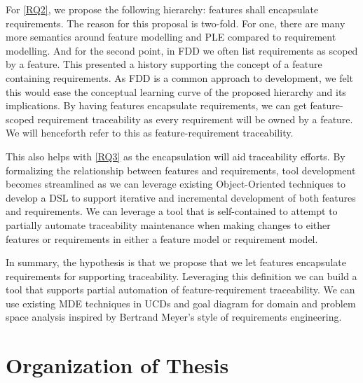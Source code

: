 For \ref{RQ2}, we propose the following hierarchy: features shall encapsulate requirements. The reason for this proposal is two-fold. For one, there are many more semantics around feature modelling and \ac{PLE} compared to requirement modelling. And for the second point, in \ac{FDD} we often list requirements as scoped by a feature. This presented a history supporting the concept of a feature containing requirements. As \ac{FDD} is a common approach to development, we felt this would ease the conceptual learning curve of the proposed hierarchy and its implications. By having features encapsulate requirements, we can get feature-scoped requirement traceability as every requirement will be owned by a feature. We will henceforth refer to this as feature-requirement traceability.

This also helps with \ref{RQ3} as the encapsulation will aid traceability efforts. By formalizing the relationship between features and requirements, tool development becomes streamlined as we can leverage existing Object-Oriented techniques to develop a \ac{DSL} to support iterative and incremental development of both features and requirements. We can leverage a tool that is self-contained to attempt to partially automate traceability maintenance when making changes to either features or requirements in either a feature model or requirement model.

In summary, the hypothesis is that we propose that we let features encapsulate requirements for supporting traceability. Leveraging this definition we can build a tool that supports partial automation of feature-requirement traceability. We can use existing \ac{MDE} techniques in \ac{UCD}s and goal diagram for domain and problem space analysis inspired by Bertrand Meyer's style of requirements engineering.

\section{Organization of Thesis}

